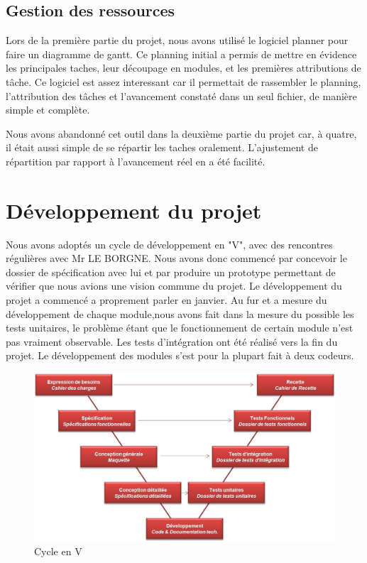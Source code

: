 \subsection{Gestion des ressources}

Lors de la première partie du projet, nous avons utilisé le logiciel planner pour faire un diagramme de gantt. Ce planning initial a permis de mettre en évidence les principales taches, leur découpage en modules, et les premières attributions de tâche. Ce logiciel est assez interessant car il permettait de rassembler le planning, l'attribution des tâches et l'avancement constaté dans un seul fichier, de manière simple et complète. 

Nous avons abandonné cet outil dans la deuxième partie du projet car, à quatre, il était aussi simple de se répartir les taches oralement. L'ajustement de répartition par rapport à l'avancement réel en a été facilité.

\section{Développement du projet}

Nous avons adoptés un cycle de développement en "V", avec des rencontres régulières avec Mr LE BORGNE. Nous avons donc commencé par concevoir le dossier de spécification avec lui et par produire un prototype permettant de vérifier que nous avions une vision commune du projet. Le développement du projet a commencé a proprement parler en janvier. Au fur et a mesure du développement de chaque module,nous avons fait dans la mesure du possible les tests unitaires, le problème étant que le fonctionnement de certain module n'est pas vraiment observable. Les tests d'intégration ont été réalisé vers la fin du projet. Le développement des modules s'est pour la plupart fait à deux codeurs.

\begin{figure}[h!]
\center
\includegraphics[width=140mm]{Images/Cycle_en_V.jpg}
\caption{Cycle en V}
\end{figure}

